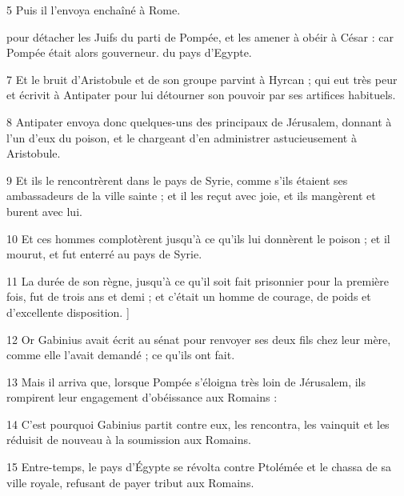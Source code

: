 \par 5 Puis il l'envoya enchaîné à Rome.

\par [Et il resta enfermé en prison jusqu'au règne de César ; qui l'a fait sortir de prison et l'a comblé de cadeaux et de faveurs ;

\par 6 et lui donnant deux généraux et douze mille hommes, il l'envoya dans le pays de Juda, [BC 49.] pour détacher les Juifs du parti de Pompée, et les amener à obéir à César : car Pompée était alors gouverneur. du pays d'Egypte.

\par 7 Et le bruit d'Aristobule et de son groupe parvint à Hyrcan ; qui eut très peur et écrivit à Antipater pour lui détourner son pouvoir par ses artifices habituels.

\par 8 Antipater envoya donc quelques-uns des principaux de Jérusalem, donnant à l'un d'eux du poison, et le chargeant d'en administrer astucieusement à Aristobule.

\par 9 Et ils le rencontrèrent dans le pays de Syrie, comme s'ils étaient ses ambassadeurs de la ville sainte ; et il les reçut avec joie, et ils mangèrent et burent avec lui.

\par 10 Et ces hommes complotèrent jusqu'à ce qu'ils lui donnèrent le poison ; et il mourut, et fut enterré au pays de Syrie.

\par 11 La durée de son règne, jusqu'à ce qu'il soit fait prisonnier pour la première fois, fut de trois ans et demi ; et c'était un homme de courage, de poids et d'excellente disposition. ]

\par 12 Or Gabinius avait écrit au sénat pour renvoyer ses deux fils chez leur mère, comme elle l'avait demandé ; ce qu'ils ont fait.

\par 13 Mais il arriva que, lorsque Pompée s'éloigna très loin de Jérusalem, ils rompirent leur engagement d'obéissance aux Romains :

\par 14 C'est pourquoi Gabinius partit contre eux, les rencontra, les vainquit et les réduisit de nouveau à la soumission aux Romains.

\par 15 Entre-temps, le pays d'Égypte se révolta contre Ptolémée et le chassa de sa ville royale, refusant de payer tribut aux Romains.


